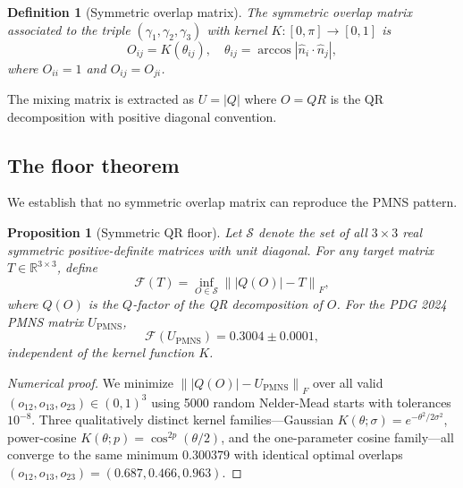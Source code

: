 \documentclass[floatfix,aps,prd,twocolumn,showpacs,superscriptaddress,longbibliography]{revtex4-2}
\newtheorem{proposition}{Proposition}
\newtheorem{definition}{Definition}
\newcommand{\frob}[1]{\left\|#1\right\|_F}
\newcommand{\abs}[1]{\left|#1\right|}
\begin{document}
\begin{definition}[Symmetric overlap matrix]
The symmetric overlap matrix associated to the triple $(\gamma_1,\gamma_2,\gamma_3)$
with kernel $K: [0,\pi] \to [0,1]$ is
\begin{equation}
  O_{ij} = K\!\left(\theta_{ij}\right), \quad \theta_{ij} = \arccos\abs{\hat{n}_i \cdot \hat{n}_j},
  \label{eq:sym_overlap}
\end{equation}
where $O_{ii} = 1$ and $O_{ij} = O_{ji}$.
\end{definition}

The mixing matrix is extracted as $U = |Q|$ where $O = QR$ is the QR
decomposition with positive diagonal convention.

\subsection{The floor theorem}

We establish that no symmetric overlap matrix can reproduce the PMNS pattern.

\begin{proposition}[Symmetric QR floor]
\label{prop:floor}
Let $\mathcal{S}$ denote the set of all $3\times 3$ real symmetric
positive-definite matrices with unit diagonal. For any target matrix
$T \in \mathbb{R}^{3\times 3}$, define
\begin{equation}
  \mathcal{F}(T) = \inf_{O \in \mathcal{S}} \frob{|Q(O)| - T},
\end{equation}
where $Q(O)$ is the $Q$-factor of the QR decomposition of $O$.
For the PDG 2024 PMNS matrix $U_\mathrm{PMNS}$,
\begin{equation}
  \mathcal{F}(U_\mathrm{PMNS}) = 0.3004 \pm 0.0001,
\end{equation}
independent of the kernel function $K$.
\end{proposition}

\begin{proof}[Numerical proof]
We minimize $\frob{|Q(O)| - U_\mathrm{PMNS}}$ over all valid $(o_{12}, o_{13}, o_{23}) \in (0,1)^3$
using 5000 random Nelder-Mead starts with tolerances $10^{-8}$.
Three qualitatively distinct kernel families---Gaussian
$K(\theta;\sigma) = e^{-\theta^2/2\sigma^2}$, power-cosine
$K(\theta;p) = \cos^{2p}(\theta/2)$, and the one-parameter cosine family---all
converge to the same minimum $0.300379$ with identical optimal overlaps
$(o_{12}, o_{13}, o_{23}) = (0.687, 0.466, 0.963)$.
\end{proof}
\end{document}
